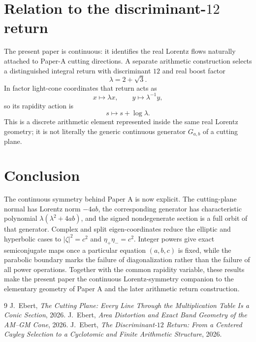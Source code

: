 \documentclass[11pt]{amsart}
\theoremstyle{remark}
\begin{document}
\section{Relation to the discriminant-$12$ return}

The present paper is continuous: it identifies the real Lorentz flows naturally attached to Paper-A cutting directions.  A separate arithmetic construction \cite{Ebert2026D12} selects a distinguished integral return with discriminant $12$ and real boost factor
\[
\lambda=2+\sqrt3.
\]
In factor light-cone coordinates that return acts as
\[
x\mapsto\lambda x,
\qquad
y\mapsto\lambda^{-1}y,
\]
so its rapidity action is
\[
s\mapsto s+\log\lambda.
\]
This is a discrete arithmetic element represented inside the same real Lorentz geometry; it is not literally the generic continuous generator $G_{a,b}$ of a cutting plane.

\section{Conclusion}

The continuous symmetry behind Paper A is now explicit.  The cutting-plane normal has Lorentz norm $-4ab$, the corresponding generator has characteristic polynomial $\lambda(\lambda^2+4ab)$, and the signed nondegenerate section is a full orbit of that generator.  Complex and split eigen-coordinates reduce the elliptic and hyperbolic cases to $|\zeta|^2=c^2$ and $\eta_+\eta_-=c^2$.  Integer powers give exact semiconjugate maps once a particular equation $(a,b,c)$ is fixed, while the parabolic boundary marks the failure of diagonalization rather than the failure of all power operations.  Together with the common rapidity variable, these results make the present paper the continuous Lorentz-symmetry companion to the elementary geometry of Paper A and the later arithmetic return construction.

\begin{thebibliography}{9}
 J.~Ebert, \emph{The Cutting Plane: Every Line Through the Multiplication Table Is a Conic Section}, 2026.
 J.~Ebert, \emph{Area Distortion and Exact Band Geometry of the AM--GM Cone}, 2026.
 J.~Ebert, \emph{The Discriminant-$12$ Return: From a Centered Cayley Selection to a Cyclotomic and Finite Arithmetic Structure}, 2026.
\end{thebibliography}
\end{document}
